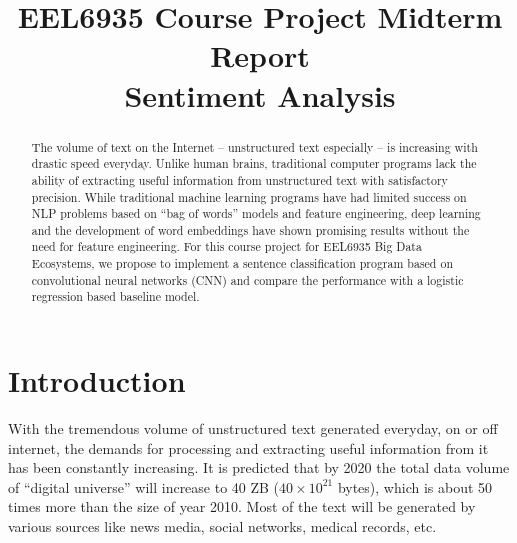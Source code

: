 \documentclass[conference]{IEEEtran}
\begin{document}
\renewcommand{\figureautorefname}{Fig.}
\newcommand{\subfigureautorefname}{Fig.}
\renewcommand{\sectionautorefname}{Section}
\renewcommand{\subsectionautorefname}{Section}


\title{EEL6935 Course Project Midterm Report \\
    Sentiment Analysis}
\author{
}

\maketitle

\begin{abstract}
    The volume of text on the Internet -- unstructured text especially --
    is increasing with drastic speed everyday. Unlike
    human brains, traditional computer programs lack the ability of extracting
    useful information from unstructured text with satisfactory precision.
    While traditional machine learning programs have had limited success
    on NLP problems based on ``bag of words'' models and feature engineering,
    deep learning and the development of word embeddings have shown
    promising results without the need for feature engineering. For this course
    project for EEL6935 Big Data Ecosystems, we propose to implement a sentence 
    classification program based on convolutional neural networks (CNN) and 
    compare the performance with a logistic regression based baseline model.
    
\end{abstract}

\IEEEpeerreviewmaketitle

\section{Introduction}
\label{intro}
    With the tremendous volume of unstructured text generated everyday, on or off
    internet, the demands for processing and extracting useful information
    from it has been constantly increasing. It is predicted that by 2020 the
    total data volume of ``digital universe'' will increase to 40 ZB
    ($40\times 10^{21}$ bytes), which is about 50 times more than the size of
    year 2010\cite{gantz2012digital}. Most of the text will be generated by various
    sources like news media, social networks, medical records, etc.
\end{document}
